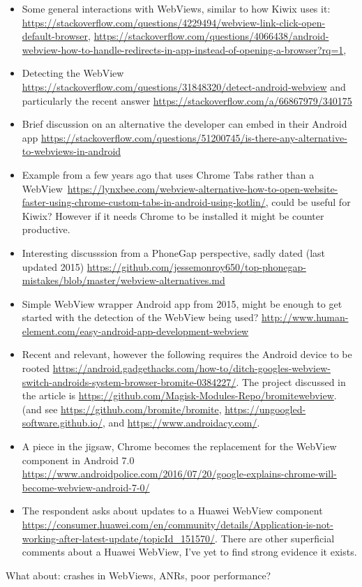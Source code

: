 \begin{itemize}
    \item Some general interactions with WebViews, similar to how Kiwix uses it: \url{https://stackoverflow.com/questions/4229494/webview-link-click-open-default-browser}, \url{https://stackoverflow.com/questions/4066438/android-webview-how-to-handle-redirects-in-app-instead-of-opening-a-browser?rq=1}, 
    \item Detecting the WebView \url{https://stackoverflow.com/questions/31848320/detect-android-webview} and particularly the recent answer \url{https://stackoverflow.com/a/66867979/340175}
    \item Brief discussion on an alternative the developer can embed in their Android app \url{https://stackoverflow.com/questions/51200745/is-there-any-alternative-to-webviews-in-android}
    \item Example from a few years ago that uses Chrome Tabs rather than a WebView~\url{https://lynxbee.com/webview-alternative-how-to-open-website-faster-using-chrome-custom-tabs-in-android-using-kotlin/}, could be useful for Kiwix? However if it needs Chrome to be installed it might be counter productive.
    \item Interesting discusssion from a PhoneGap perspective, sadly dated (last updated 2015) \url{https://github.com/jessemonroy650/top-phonegap-mistakes/blob/master/webview-alternatives.md}
    \item Simple WebView wrapper Android app from 2015, might be enough to get started with the detection of the WebView being used? \url{http://www.human-element.com/easy-android-app-development-webview}
    \item Recent and relevant, however the following requires the Android device to be rooted \url{https://android.gadgethacks.com/how-to/ditch-googles-webview-switch-androids-system-browser-bromite-0384227/}. The project discussed in the article is \url{https://github.com/Magisk-Modules-Repo/bromitewebview}. (and see \url{https://github.com/bromite/bromite}, \url{https://ungoogled-software.github.io/}, and \url{https://www.androidacy.com/}.
    \item A piece in the jigsaw, Chrome becomes the replacement for the WebView component in Android 7.0 \url{https://www.androidpolice.com/2016/07/20/google-explains-chrome-will-become-webview-android-7-0/}
    \item The respondent asks about updates to a Huawei WebView component \url{https://consumer.huawei.com/en/community/details/Application-is-not-working-after-latest-update/topicId_151570/}. There are other superficial comments about a Huawei WebView, I've yet to find strong evidence it exists.
\end{itemize}




What about: crashes in WebViews, ANRs, poor performance?